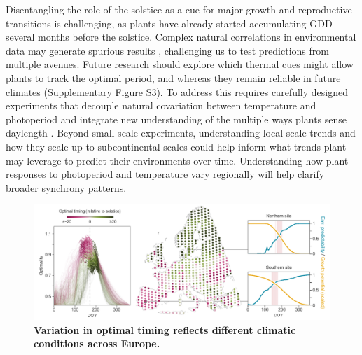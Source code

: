 \documentclass[11pt,letter]{article}
\begin{document}
Disentangling the role of the solstice as a cue for major growth and reproductive transitions is challenging, as plants have already started accumulating GDD several months before the solstice.
Complex natural correlations in environmental data may generate spurious results \citep[e.g.][]{Gao2024}, challenging us to test predictions from multiple avenues. %
Future research should explore which thermal cues might allow plants to track the optimal period, and whereas they remain reliable in future climates (Supplementary Figure S3).
To address this requires carefully designed experiments that decouple natural covariation between temperature and photoperiod  \citep{Buonaiuto2023} and integrate new understanding of the multiple ways plants sense daylength \citep{wang2024plants}.  %
Beyond small-scale experiments, understanding local-scale trends and how they scale up to subcontinental scales could help inform what trends plant may leverage to predict their environments over time. Understanding how plant responses to photoperiod and temperature vary regionally will help clarify broader synchrony patterns.

\begin{figure}[h]
\hspace*{-1.2cm}
\includegraphics{local_optimality_alt.pdf}
\vspace*{-0.7cm}
\caption{\textbf{Variation in optimal timing reflects different climatic conditions across Europe.}}
\label{fig:localoptimality}
\end{figure}



\end{document}
